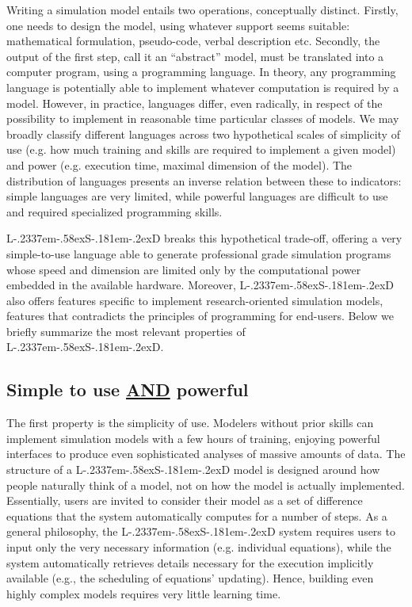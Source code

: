 \documentclass [11pt,a4paper] {book}
\def\LsD{{L\kern-.2337em\lower-.58ex\hbox{S}\kern-.181em\lower-.2ex\hbox{D}}\xspace}
\begin{document}
Writing a simulation model entails two operations, conceptually distinct. Firstly, one needs to design the model, using whatever support seems suitable: mathematical formulation, pseudo-code, verbal description etc. Secondly, the output of the first step, call it an ``abstract'' model, must be translated into a computer program, using a programming language. In theory, any programming language is potentially able to implement whatever computation is required by a model. However, in practice, languages differ, even radically, in respect of the possibility to implement in reasonable time particular classes of models. We may broadly classify different languages across two hypothetical scales of simplicity of use (e.g. how much training and skills are required to implement a given model) and power  (e.g. execution time, maximal dimension of the model). The distribution of languages presents an inverse relation between these to indicators: simple languages are very limited, while powerful languages are difficult to use and required specialized programming skills.

\LsD breaks this hypothetical trade-off, offering a very simple-to-use language able to generate professional grade simulation programs whose speed and dimension are limited only by the computational power embedded in the available hardware. Moreover, \LsD also offers features specific to implement research-oriented simulation models, features that contradicts the principles of programming for end-users. Below we briefly summarize the most relevant properties of \LsD. 

\subsection{Simple to use \underline{AND}\xspace  powerful}
The first property is the simplicity of use. Modelers without prior skills can implement simulation models with a few hours of training, enjoying powerful interfaces to produce even sophisticated analyses of massive amounts of data. The structure of a \LsD model is designed around how people naturally think of a model, not on how the model is actually implemented. Essentially, users are invited to consider their model as a set of difference equations that the system automatically computes for a number of steps. As a general philosophy, the \LsD system requires users to input only the very necessary information (e.g. individual equations), while the system automatically retrieves details necessary for the execution implicitly available (e.g., the scheduling of equations' updating). Hence, building even highly complex models requires very little learning time.
\end{document}
